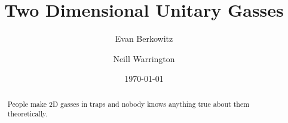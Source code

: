 \documentclass[aps,superscriptaddress,tightenlines,nofootinbib,floatfix,longbibliography,notitlepage]{revtex4-1}
\begin{document}
\title{Two Dimensional Unitary Gasses}

\author{Evan Berkowitz}
\author{Neill Warrington}

\date{\today}

\begin{abstract}
	People make 2D gasses in traps and nobody knows anything true about them theoretically.
\end{abstract}

\maketitle






\end{document}
